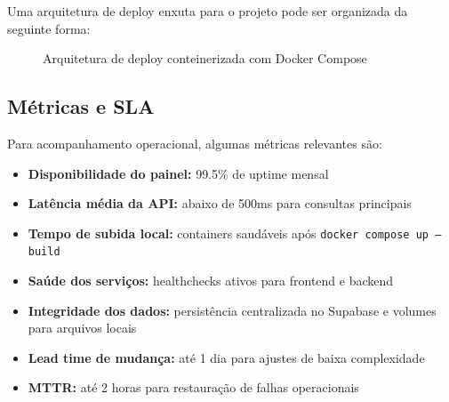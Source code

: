Uma arquitetura de deploy enxuta para o projeto pode ser organizada da seguinte forma:

\begin{figure}[H]
\centering
{}
\caption{Arquitetura de deploy conteinerizada com Docker Compose}
\label{fig:deployment}
\end{figure}

\subsection{Métricas e SLA}

Para acompanhamento operacional, algumas métricas relevantes são:

\begin{itemize}
    \item \textbf{Disponibilidade do painel:} 99.5\% de uptime mensal
    \item \textbf{Latência média da API:} abaixo de 500ms para consultas principais
    \item \textbf{Tempo de subida local:} containers saudáveis após \texttt{docker compose up --build}
    \item \textbf{Saúde dos serviços:} healthchecks ativos para frontend e backend
    \item \textbf{Integridade dos dados:} persistência centralizada no Supabase e volumes para arquivos locais
    \item \textbf{Lead time de mudança:} até 1 dia para ajustes de baixa complexidade
    \item \textbf{MTTR:} até 2 horas para restauração de falhas operacionais
\end{itemize}

